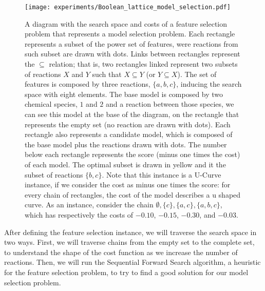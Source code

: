 \begin{figure}[h!]
\begin{center}
    \texttt{[image: experiments/Boolean\_lattice\_model\_selection.pdf]}
    \caption{A diagram with the search space and costs of a feature 
    selection problem that represents a model selection problem. Each 
    rectangle represents a subset of the power set of features, were
    reactions from such subset are drawn with dots. Links between 
    rectangles represent the $\subseteq$ relation; that is, two 
    rectangles linked represent two subsets of reactions $X$ and $Y$ 
    such that $X \subseteq Y$ (or $Y \subseteq X$). The set of features 
    is composed by three reactions, $\{a, b, c\}$, inducing the search 
    space with eight elements. The base model is composed by two 
    chemical species, $1$ and $2$ and a reaction between those species, 
    we can see this model at the base of the diagram, on the rectangle 
    that represents the empty set (no reaction are drawn with dots). 
    Each rectangle also represents a candidate model, which is composed 
    of the base model plus the reactions drawn with dots. The number
    below each rectangle represents the score (minus one times the cost)
    of each model. The optimal subset is drawn in yellow and it the
    subset of reactions $\{b, c\}$. Note that this instance is a U-Curve 
    instance, if we consider the cost as minus one times the score: for 
    every chain of rectangles, the cost of the model describes a u 
    shaped curve. As an instance, consider the chain $\emptyset, \{c\} 
    , \{a, c\}, \{a, b, c\}$, which has respectively the costs of
    $-0.10$, $-0.15$, $-0.30$, and $-0.03$.}
    \label{fig:feature_selection_model_selection}
    \end{center}
\end{figure}

After defining the feature selection instance, we will traverse the
search space in two ways. First, we will traverse chains from the empty
set to the complete set, to understand the shape of the cost function as
we increase the number of reactions. Then, we will run the Sequential 
Forward Search algorithm, a heuristic for the feature selection problem,
to try to find a good solution for our model selection problem.





